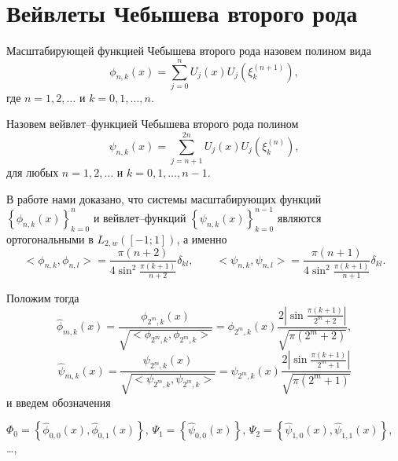 \section{Вейвлеты Чебышева второго рода}


\begin{definition}
Масштабирующей функцией Чебышева второго рода назовем полином вида
\begin{equation*}
\label{scaling}
\phi_{n,k}(x) = \sum\limits_{j=0}^{n}U_{j}(x)U_{j}(\xi_{k}^{(n+1)}),
\end{equation*}
где
$n=1,2,\ldots$ и $k=0,1,\ldots,n$.
\end{definition}

\begin{definition}
Назовем вейвлет--функцией Чебышева второго рода полином
\begin{equation*}
\label{sms1wavelet}
\psi_{n,k}(x) = \sum\limits_{j=n+1}^{2n}U_{j}(x)U_{j}(\xi_{k}^{(n)}),
\end{equation*}
для любых
$n=1,2,\ldots$ и $k=0,1,\ldots,n-1$.
\end{definition}

В работе \cite{sms11}
нами доказано, что системы масштабирующих функций  $\left\{ \phi_{n,k}(x)\right\}_{k=0}^{n}$ \linebreak и
вейвлет--функций $\left\{ \psi_{n,k}(x)\right\}_{k=0}^{n-1}$ являются ортогональными в $L_{2, w}([-1; 1])$, а именно
\begin{equation*}
<\phi_{n,k}, \phi_{n,l}> =
\frac{\pi(n+2)}{4\sin^2{\frac{\pi(k+1)}{n+2}}} \delta_{kl}, \qquad <\psi_{n,k}, \psi_{n,l}> =
\frac{\pi(n+1)}{4\sin^2{\frac{\pi(k+1)}{n+1}}} \delta_{kl}.
\end{equation*}

Положим тогда
\begin{equation*}
\hat{\phi}_{m,k}(x) = \frac{\phi_{2^m,k}(x)}{\sqrt{<\phi_{2^m,k}, \phi_{2^m,k}>}} = \phi_{2^m,k}(x)   \frac{2\left|\sin{\frac{\pi(k+1)}{2^m+2}}\right|}{\sqrt{\pi(2^m+2)}},
\end{equation*}
\begin{equation*}
\hat{\psi}_{m,k}(x) = \frac{\psi_{2^m,k}(x)}{\sqrt{<\psi_{2^m,k}, \psi_{2^m,k}>}} = \psi_{2^m,k}(x)   \frac{2\left| \sin{\frac{\pi(k+1)}{2^m+1}}\right|}{\sqrt{\pi(2^m+1)}}
\end{equation*}
и введем обозначения

$\Phi_{0} = \left\{\hat{\phi}_{0,0}(x), \hat{\phi}_{0,1}(x) \right\}$,
$\Psi_{1} =  \left\{\hat{\psi}_{0,0}(x) \right\}$,
$\Psi_{2} =  \left\{\hat{\psi}_{1,0}(x), \hat{\psi}_{1,1}(x) \right\}$, \ldots ,

